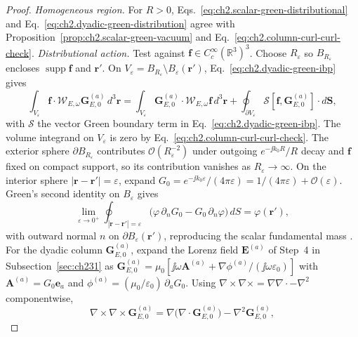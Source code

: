 \begin{proof}
\emph{Homogeneous region.} For $R>0$, Eqs.~\eqref{eq:ch2.scalar-green-distributional} and
Eq.~\eqref{eq:ch2.dyadic-green-distribution} agree with Proposition~\ref{prop:ch2.scalar-green-vacuum}
and Eq.~\eqref{eq:ch2.column-curl-curl-check}.
\emph{Distributional action.} Test against $\mathbf{f}\in C_c^{\infty}(\mathbb{R}^{3})^{3}$.
Choose $R_\varepsilon$ so $B_{R_\varepsilon}$ encloses $\operatorname{supp}\mathbf{f}$ and $\mathbf{r}'$.
On $V_\varepsilon=B_{R_\varepsilon}\setminus B_\varepsilon(\mathbf{r}')$, Eq.~\eqref{eq:ch2.dyadic-green-ibp} gives
\[
\int_{V_\varepsilon}\mathbf{f}\cdot\mathcal{W}_{E,\omega}\mathbf{G}_{E,0}^{(a)}\,d^{3}\mathbf{r}
=
\int_{V_\varepsilon}\mathbf{G}_{E,0}^{(a)}\cdot\mathcal{W}_{E,\omega}\mathbf{f}\,d^{3}\mathbf{r}
+\oint_{\partial V_\varepsilon}\boldsymbol{\mathcal{S}}[\mathbf{f},\mathbf{G}_{E,0}^{(a)}]\cdot d\mathbf{S},
\]
with $\boldsymbol{\mathcal{S}}$ the vector Green boundary term in Eq.~\eqref{eq:ch2.dyadic-green-ibp}.
The volume integrand on $V_\varepsilon$ is zero by Eq.~\eqref{eq:ch2.column-curl-curl-check}.
The exterior sphere $\partial B_{R_\varepsilon}$ contributes $\mathcal{O}(R_\varepsilon^{-2})$ under outgoing
$e^{-\jj k_0 R}/R$ decay and $\mathbf{f}$ fixed on compact support, so its contribution vanishes as $R_\varepsilon\to\infty$.
On the interior sphere $|{\mathbf{r}-\mathbf{r}'}|=\varepsilon$, expand
$G_0=e^{-\jj k_0\varepsilon}/(4\pi\varepsilon)=1/(4\pi\varepsilon)+\mathcal{O}(\varepsilon)$.
Green's second identity on $B_\varepsilon$ gives
\begin{equation}
\label{eq:ch2.scalar-interior-sphere-limit}
\lim_{\varepsilon\to 0^{+}}
\oint_{|\mathbf{r}-\mathbf{r}'|=\varepsilon}
\Big(\varphi\,\partial_{n}G_0-G_0\,\partial_{n}\varphi\Big)\,dS
=\varphi(\mathbf{r}'),
\end{equation}
with outward normal $n$ on $\partial B_\varepsilon(\mathbf{r}')$, reproducing the scalar fundamental mass
\cite{jackson1999,stratton1941}.
For the dyadic column $\mathbf{G}_{E,0}^{(a)}$, expand the Lorenz field $\mathbf{E}^{(a)}$ of Step~4 in
Subsection~\ref{sec:ch231} as $\mathbf{G}_{E,0}^{(a)}=\mu_0\!\left[\jj\omega\mathbf{A}^{(a)}+\nabla\phi^{(a)}/(\jj\omega\varepsilon_0)\right]$
with $\mathbf{A}^{(a)}=G_0\mathbf{e}_a$ and $\phi^{(a)}=(\mu_0/\varepsilon_0)\,\partial_a G_0$.
Using $\nabla\times\nabla\times=\nabla\nabla\cdot-\nabla^{2}$ componentwise,
\begin{equation}
\label{eq:ch2.column-vector-laplacian-split}
\nabla\times\nabla\times\mathbf{G}_{E,0}^{(a)}
=\nabla\big(\nabla\cdot\mathbf{G}_{E,0}^{(a)}\big)-\nabla^{2}\mathbf{G}_{E,0}^{(a)},

\end{equation}
\end{proof}
